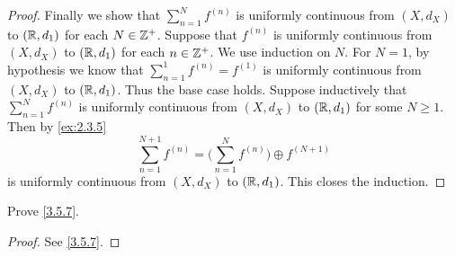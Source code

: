 \begin{proof}
  Finally we show that \(\sum_{n = 1}^N f^{(n)}\) is uniformly continuous from \((X, d_X)\) to \((\mathbb{R}, d_1)\) for each \(N \in \mathbb{Z}^+\).
  Suppose that \(f^{(n)}\) is uniformly continuous from \((X, d_X)\) to \((\mathbb{R}, d_1)\) for each \(n \in \mathbb{Z}^+\).
  We use induction on \(N\).
  For \(N = 1\), by hypothesis we know that \(\sum_{n = 1}^1 f^{(n)} = f^{(1)}\) is uniformly continuous from \((X, d_X)\) to \((\mathbb{R}, d_1)\).
  Thus the base case holds.
  Suppose inductively that \(\sum_{n = 1}^N f^{(n)}\) is uniformly continuous from \((X, d_X)\) to \((\mathbb{R}, d_1)\) for some \(N \geq 1\).
  Then by \cref{ex:2.3.5}
  \[
    \sum_{n = 1}^{N + 1} f^{(n)} = \bigg(\sum_{n = 1}^N f^{(n)}\bigg) \oplus f^{(N + 1)}
  \]
  is uniformly continuous from \((X, d_X)\) to \((\mathbb{R}, d_1)\).
  This closes the induction.
\end{proof}

\begin{ex}\label{ex:3.5.2}
  Prove \cref{3.5.7}.
\end{ex}

\begin{proof}
  See \cref{3.5.7}.
\end{proof}